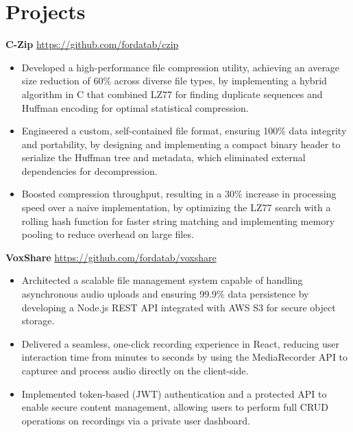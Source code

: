 \documentclass[11pt]{article}       %
\begin{document}
\vspace{-18.5pt}

\section*{Projects}


\textbf{C-Zip} \hfill \href{https://github.com/fordatab/czip}{https://github.com/fordatab/czip} \
\vspace{-10pt}
\begin{itemize}
\item Developed a high-performance file compression utility, achieving an average size reduction of 60\% across diverse file types, by implementing a hybrid algorithm in C that combined LZ77 for finding duplicate sequences and Huffman encoding for optimal statistical compression.
\item Engineered a custom, self-contained file format, ensuring 100\% data integrity and portability, by designing and implementing a compact binary header to serialize the Huffman tree and metadata, which eliminated external dependencies for decompression.
\item Boosted compression throughput, resulting in a 30\% increase in processing speed over a naive implementation, by optimizing the LZ77 search with a rolling hash function for faster string matching and implementing memory pooling to reduce overhead on large files.
\end{itemize}

\textbf{VoxShare} \hfill \href{https://github.com/fordatab/voxshare}{https://github.com/fordatab/voxshare} \
\vspace{-10pt}
\begin{itemize}
\item Architected a scalable file management system capable of handling asynchronous audio uploads and ensuring 99.9\% data persistence by developing a Node.js REST API integrated with AWS S3 for secure object storage.
\item Delivered a seamless, one-click recording experience in React, reducing user interaction time from minutes to seconds by using the MediaRecorder API to capturee and process audio directly on the client-side.
\item Implemented token-based (JWT) authentication and a protected API to enable secure content management, allowing users to perform full CRUD operations on recordings via a private user dashboard.
\end{itemize}
\end{document}
